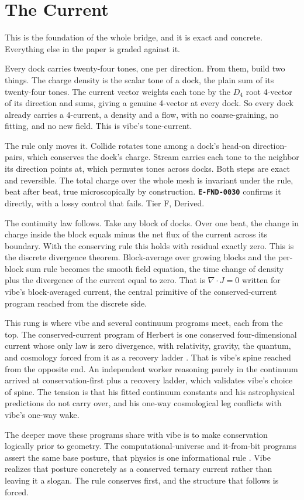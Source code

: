 \section{The Current}

This is the foundation of the whole bridge, and it is exact and concrete. Everything else in the paper is graded against it.

Every dock carries twenty-four tones, one per direction. From them, build two things. The charge density is the scalar tone of a dock, the plain sum of its twenty-four tones. The current vector weights each tone by the $D_4$ root 4-vector of its direction and sums, giving a genuine 4-vector at every dock. So every dock already carries a 4-current, a density and a flow, with no coarse-graining, no fitting, and no new field. This is vibe's tone-current.

The rule only moves it. Collide rotates tone among a dock's head-on direction-pairs, which conserves the dock's charge. Stream carries each tone to the neighbor its direction points at, which permutes tones across docks. Both steps are exact and reversible. The total charge over the whole mesh is invariant under the rule, beat after beat, true microscopically by construction. \textbf{\texttt{E-FND-0030}} confirms it directly, with a lossy control that fails. Tier F, Derived.

The continuity law follows. Take any block of docks. Over one beat, the change in charge inside the block equals minus the net flux of the current across its boundary. With the conserving rule this holds with residual exactly zero. This is the discrete divergence theorem. Block-average over growing blocks and the per-block sum rule becomes the smooth field equation, the time change of density plus the divergence of the current equal to zero. That is $\nabla\!\cdot J = 0$ written for vibe's block-averaged current, the central primitive of the conserved-current program reached from the discrete side.

This rung is where vibe and several continuum programs meet, each from the top. The conserved-current program of Herbert is one conserved four-dimensional current whose only law is zero divergence, with relativity, gravity, the quantum, and cosmology forced from it as a recovery ladder \cite{herbert2025chronoflux}. That is vibe's spine reached from the opposite end. An independent worker reasoning purely in the continuum arrived at conservation-first plus a recovery ladder, which validates vibe's choice of spine. The tension is that his fitted continuum constants and his astrophysical predictions do not carry over, and his one-way cosmological leg conflicts with vibe's one-way wake.

The deeper move these programs share with vibe is to make conservation logically prior to geometry. The computational-universe and it-from-bit programs assert the same base posture, that physics is one informational rule \cite{lloyd2002}. Vibe realizes that posture concretely as a conserved ternary current rather than leaving it a slogan. The rule conserves first, and the structure that follows is forced.
